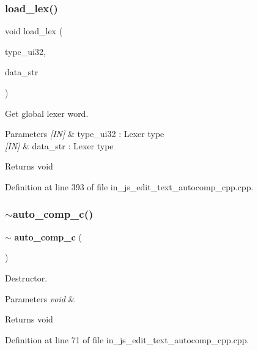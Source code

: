 \subsubsection{load\_lex()}
{\footnotesize\ttfamily void load\+\_\+lex (\begin{DoxyParamCaption}\item[{uint32\+\_\+t}]{type\+\_\+ui32,  }\item[{wx\+String \&}]{data\+\_\+str }\end{DoxyParamCaption})}



Get global lexer word. 


\begin{DoxyParams}{Parameters}
{\em \mbox{[}\+I\+N\mbox{]}} & type\+\_\+ui32 \+: Lexer type \\
\hline
{\em \mbox{[}\+I\+N\mbox{]}} & data\+\_\+str \+: Lexer type \\
\hline
\end{DoxyParams}
\begin{DoxyReturn}{Returns}
void 
\end{DoxyReturn}


Definition at line 393 of file in\+\_\+js\+\_\+edit\+\_\+text\+\_\+autocomp\+\_\+cpp.\+cpp.

\mbox{\label{group___edit__text__autocompetation_ga81a95e4195c665a167b15394fb156f7c}} 
\subsubsection{$\sim$auto\_comp\_c()}
{\footnotesize\ttfamily $\sim$\textbf{ auto\+\_\+comp\+\_\+c} (\begin{DoxyParamCaption}\item[{void}]{ }\end{DoxyParamCaption})}



Destructor. 


\begin{DoxyParams}{Parameters}
{\em void} & \\
\hline
\end{DoxyParams}
\begin{DoxyReturn}{Returns}
void 
\end{DoxyReturn}


Definition at line 71 of file in\+\_\+js\+\_\+edit\+\_\+text\+\_\+autocomp\+\_\+cpp.\+cpp.

